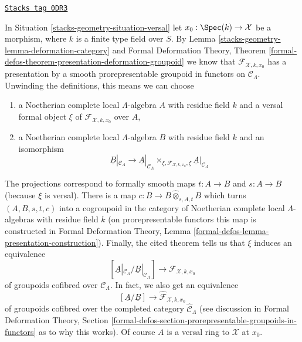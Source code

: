 \begin{remark}
\label{stacks-geometry-remark-groupoid-defo}
\href{https://stacks.math.columbia.edu/tag/0DR3}{\texttt{Stacks tag 0DR3}}

In Situation \ref{stacks-geometry-situation-versal} let $x_0 : \Spec(k) \to \mathcal{X}$
be a morphism, where $k$ is a finite type field over $S$.
By Lemma \ref{stacks-geometry-lemma-deformation-category} and
Formal Deformation Theory, Theorem
\ref{formal-defos-theorem-presentation-deformation-groupoid}
we know that $\mathcal{F}_{\mathcal{X}, k, x_0}$ has a
presentation by a smooth prorepresentable groupoid in
functors on $\mathcal{C}_\Lambda$.
Unwinding the definitions, this means we can choose
\begin{enumerate}
\item a Noetherian complete local $\Lambda$-algebra $A$
with residue field $k$ and a versal formal object $\xi$
of $\mathcal{F}_{\mathcal{X}, k, x_0}$ over $A$,
\item a Noetherian complete local $\Lambda$-algebra $B$
with residue field $k$ and an isomorphism
$$
\underline{B}|_{\mathcal{C}_\Lambda}
\longrightarrow
\underline{A}|_{\mathcal{C}_\Lambda}
\times_{\underline{\xi}, \mathcal{F}_{\mathcal{X}, k, x_0}, \underline{\xi}}
\underline{A}|_{\mathcal{C}_\Lambda}
$$
\end{enumerate}
The projections correspond to formally smooth maps
$t : A \to B$ and $s : A \to B$ (because $\xi$ is versal).
There is a map $c : B \to B \widehat{\otimes}_{s, A, t} B$
which turns $(A, B, s, t, c)$ into a cogroupoid in the category
of Noetherian complete local $\Lambda$-algebras with residue field $k$
(on prorepresentable functors this map is constructed in
Formal Deformation Theory, Lemma
\ref{formal-defos-lemma-presentation-construction}).
Finally, the cited theorem tells us that $\xi$ induces
an equivalence
$$
[\underline{A}|_{\mathcal{C}_\Lambda} / \underline{B}|_{\mathcal{C}_\Lambda}]
\longrightarrow
\mathcal{F}_{\mathcal{X}, k, x_0}
$$
of groupoids cofibred over $\mathcal{C}_\Lambda$. In fact, we also
get an equivalence
$$
[\underline{A}/\underline{B}]
\longrightarrow
\widehat{\mathcal{F}}_{\mathcal{X}, k, x_0}
$$
of groupoids cofibred over the completed category
$\widehat{\mathcal{C}}_\Lambda$ (see discussion in
Formal Deformation Theory, Section
\ref{formal-defos-section-prorepresentable-groupoids-in-functors}
as to why this works). Of course $A$ is a versal ring to
$\mathcal{X}$ at $x_0$.
\end{remark}


